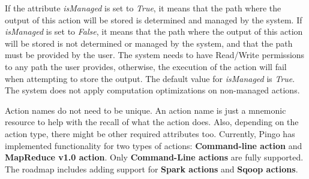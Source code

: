 If the attribute \textit{isManaged} is set to \textit{True}, it means that the path where the output of this action will be stored is determined and managed by the system. If \textit{isManaged} is set to \textit{False}, it means that the path where the output of this action will be stored is not determined or managed by the system, and that the path must be provided by the user. The system needs to have Read/Write permissions to any path the user provides, otherwise, the execution of the action will fail when attempting to store the output. The default value for \textit{isManaged} is \textit{True}. The system does not apply computation optimizations on non-managed actions.

Action names do not need to be unique. An action name is just a mnemonic resource to help with the recall of what the action does. Also, depending on the action type, there might be other required attributes too. Currently, Pingo has implemented functionality for two types of actions: \textbf{Command-line action} and \textbf{MapReduce v1.0 action}. Only \textbf{Command-Line actions} are fully supported. The roadmap includes adding support for \textbf{Spark actions} and \textbf{Sqoop actions}.

